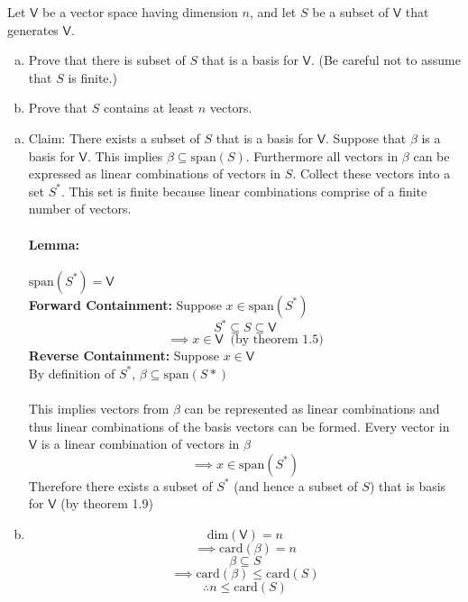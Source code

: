 Let $\mathsf{V}$ be a vector space having dimension $n$, and let $S$
be a subset of $\mathsf{V}$ that generates $\mathsf{V}$.
\begin{enumerate}[(a)]
\item Prove that there is subset of $S$ that is a basis for
  $\mathsf{V}$. (Be careful not to assume that $S$ is finite.)
\item Prove that $S$ contains at least $n$ vectors.
\end{enumerate}
\begin{enumerate}[(a)]
\item Claim: There exists a subset of $S$ that is a basis for
  $\mathsf{V}$. Suppose that $\beta$ is a basis for $\mathsf{V}$. This
  implies $\beta\subseteq\text{span}(S)$. Furthermore all vectors in
  $\beta$ can be expressed as linear combinations of vectors in
  $S$. Collect these vectors into a set $S^*$. This set is finite
  because linear combinations comprise of a finite number of vectors.
\paragraph{Lemma:} $\text{span}(S^*)=\mathsf{V}$
\\\textbf{Forward Containment:} Suppose $x\in \text{span}(S^*)$
\begin{equation}
S^* \subseteq S \subseteq \mathsf{V}
\end{equation}
\begin{equation}
\implies x \in \mathsf{V}\;\;\text{(by theorem 1.5)}
\end{equation}
\textbf{Reverse Containment:} Suppose $x\in\mathsf{V}$
\\By definition of $S^*$, $\beta\subseteq \text{span}(S*)$
\paragraph{} This implies vectors from $\beta$ can be represented as
linear combinations and thus linear combinations of the basis vectors
can be formed. Every vector in $\mathsf{V}$ is a linear combination of
vectors in $\beta$
\begin{equation}
\implies x \in \text{span}(S^*)
\end{equation}
Therefore there exists a subset of $S^*$ (and hence a subset of $S$) that is basis for
$\mathsf{V}$ (by theorem 1.9)
\item
\begin{equation}
\text{dim}(\mathsf{V}) = n
\end{equation}
\begin{equation}
\implies \text{card}(\beta) = n
\end{equation}
\begin{equation}
\beta \subseteq S
\end{equation}
\begin{equation}
\implies \text{card}(\beta) \leq \text{card}(S)
\end{equation}
\begin{equation}
\therefore n\leq \text{card}(S)
\end{equation}
\end{enumerate}
